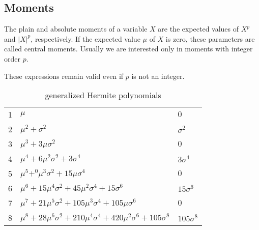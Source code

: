 \documentclass{scrartcl}
\begin{document}
\subsection{Moments}
The plain and absolute moments of a variable $X$ are the expected values of $X^{p}$ and $|X|^{p}$, respectively. If the expected value $\mu$ of $X$ is zero, these parameters are called central moments. Usually we are interested only in moments with integer order $p$. 

These expressions remain valid even if $p$ is not an integer. 
\begin{table}[]
    \centering
    \begin{tabular}{l|l|l}
         1 & $\mu$ & $0$\\
         2 & $\mu^2+\sigma^2$ & $\sigma^2$\\
         3 & $\mu^3+3\mu\sigma^2$ & $0$\\
         4 & $\mu^4+6\mu^2\sigma^2+3\sigma^4$ & $3\sigma^4$\\
         5 & $\mu^5+^0\mu^3\sigma^2+15\mu\sigma^4$ & $0$\\
         6 & $\mu ^{6}+15\mu ^{4}\sigma ^{2}+45\mu ^{2}\sigma ^{4}+15\sigma ^{6}$ & $15\sigma^6$\\
         7 & $\displaystyle \mu ^{7}+21\mu ^{5}\sigma ^{2}+105\mu ^{3}\sigma ^{4}+105\mu \sigma ^{6}$ & $0$\\
         8 & $\mu ^{8}+28\mu ^{6}\sigma ^{2}+210\mu ^{4}\sigma ^{4}+420\mu ^{2}\sigma ^{6}+105\sigma ^{8}$ & $105\sigma^8$\\
    \end{tabular}
    \caption{generalized Hermite polynomials}
    \label{tab:my_label}
\end{table}
\end{document}
